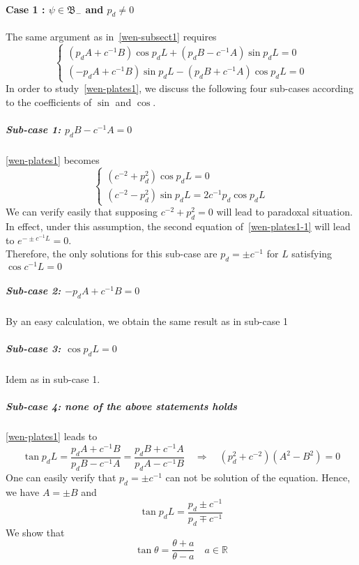 \paragraph{Case 1 : $\psi \in \mathfrak{B}_-$ and $p_d \neq 0$}
The same argument as in~\cref{wen-subsect1} requires
\begin{equation}\label{wen-plates1}
\begin{cases}
(p_d A + c^{-1} B) \cos p_d L + (p_d B - c^{-1} A)\sin p_d L = 0 \\
(- p_d A + c^{-1}B)\sin p_d L - (p_d B + c^{-1} A)\cos p_d L = 0
\end{cases}
\end{equation}
In order to study~\cref{wen-plates1}, we discuss the following four sub-cases according to the coefficients of $\sin$ and $\cos$.
\subparagraph{Sub-case 1: $ p_d B - c^{-1}A = 0$}
\cref{wen-plates1} becomes
\begin{equation}\label{wen-plates1-1}
\begin{cases}
(c^{-2} + p_d ^2)\cos p_d L = 0 \\
(c^{-2} - p_d^2)\sin p_d L = 2 c^{-1}p_d \cos p_d L
\end{cases}
\end{equation}
We can verify easily that supposing $ c^{-2} + p_d^2 = 0 $ will lead to paradoxal situation. 
In effect, under this assumption, the second equation of~\cref{wen-plates1-1} will lead to $e^{-\pm c^{-1}L} = 0$. \\
Therefore, the only solutions for this sub-case are $p_d = \pm c^{-1}$ for $L$ satisfying $\cos c^{-1} L = 0$
%
\subparagraph{Sub-case 2: $ -p_d A + c^{-1}B = 0$}
By an easy calculation, we obtain the same result as in sub-case 1
%
\subparagraph{Sub-case 3: $\cos p_d L = 0 $}
Idem as in sub-case 1.
%
\subparagraph{Sub-case 4: none of the above statements holds}
\cref{wen-plates1} leads to
\begin{equation*}
\tan p_d L = \frac{p_d A + c^{-1} B }{p_d B - c^{-1} A} = 
\frac{p_d B + c^{-1}A}{p_d A- c^{-1} B}
\quad\Rightarrow\quad
(p_d ^2 + c^{-2})(A^2 - B^2 )= 0
\end{equation*}
One can easily verify that $p_d = \pm c^{-1}$ can not be solution of the equation. 
Hence, we have $A = \pm B$ and
\begin{equation}\label{wen-tan}
\tan p_d L = \frac{p_d \pm c^{-1}}{p_d \mp c^{-1}}
\end{equation}
We show that
\begin{equation*}
\tan \theta = \frac{\theta + a}{\theta - a} \quad a\in \mathbb{R} 
\end{equation*}
